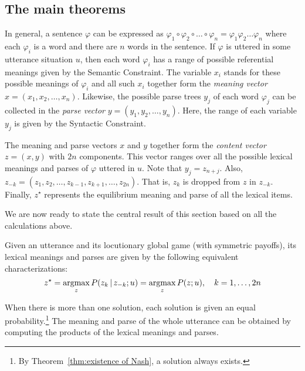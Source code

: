 \subsection{The main theorems}\label{sec:maintheorem}

In general, a sentence $\varphi$ can be expressed as $\varphi_1 \circ \varphi_2 \circ \ldots \circ \varphi_n = \varphi_1 \varphi_2 \ldots \varphi_n$ where each $\varphi_i$ is a word and there are $n$ words in the sentence. If $\varphi$ is uttered in some utterance situation $u$, then each word $\varphi_i$ has a range of possible referential meanings given by the Semantic Constraint. The variable $x_i$ stands for these possible meanings of $\varphi_i$ and all such $x_i$ together form the \emph{meaning vector} $x = (x_1, x_2, \ldots, x_n)$. Likewise, the possible parse trees $y_j$ of each word $\varphi_j$ can be collected in the \emph{parse vector} $y = (y_1, y_2, \ldots, y_n)$. Here, the range of each variable $y_j$ is given by the Syntactic Constraint.

The meaning and parse vectors $x$ and $y$ together form the \emph{content vector} $z = (x, y)$ with $2n$ components. This vector ranges over all the possible lexical meanings and parses of $\varphi$ uttered in $u$. Note that $y_j = z_{n + j}$. Also, $z_{-k} = (z_1, z_2, \ldots, z_{k-1},\allowbreak z_{k+1}, \ldots, z_{2n})$. That is, $z_k$ is dropped from $z$ in $z_{-k}$. Finally, $z^{\star}$ represents the equilibrium meaning and parse of all the lexical items.

We are now ready to state the central result of this section based on all the calculations above. 

\begin{theorem}
Given an utterance and its locutionary global game (with symmetric payoffs), its lexical meanings and parses are given by the following equivalent characterizations:
\begin{equation}
z^\star = \operatorname*{argmax}_{z} P(z_k \,|\, z_{-k}; u) = \operatorname*{argmax}_{z} P(z; u), \quad k = 1, \dots, 2n \label{eq:simple}
\end{equation}

\noindent When there is more than one solution, each solution is given an equal probability.\footnote{By Theorem~\ref{thm:existence of Nash}, a solution always exists.} The meaning and parse of the whole utterance can be obtained by computing the products of the lexical meanings and parses.
\label{thm:simple equation}
\end{theorem}


